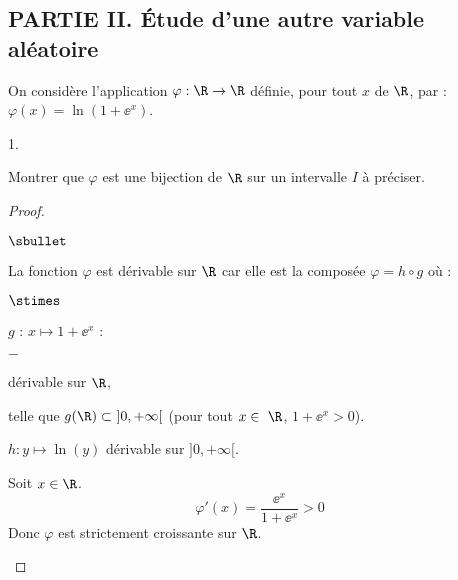 \documentclass[11pt]{article}%
\begin{document}
\subsection*{PARTIE II. Étude d'une autre variable aléatoire}

\noindent
On considère l'application $\varphi: \R\rightarrow\R$ définie, pour
tout $x$ de $\R$, par : $\varphi(x) = \ln(1+\ee^x)$.
\begin{noliste}{1.}
  \setlength{\itemsep}{2mm}%
  \setcounter{enumi}{4}
\item Montrer que $\varphi$ est une bijection de $\R$ sur un 
  intervalle $I$ à préciser.

\begin{proof}~
 \begin{noliste}{$\sbullet$}
 \item La fonction $\varphi$ est dérivable sur $\R$ car elle est la
   composée $\varphi = h\circ g$ où :
  \begin{noliste}{$\stimes$}
  \item $g$ : $x\mapsto 1+\ee^x$ :
      \begin{noliste}{$-$}
      \item dérivable sur $\R$,
      \item telle que $g(\R)\subset \ ]0,+\infty[$ (pour tout $x\in \
        \R$, $1+\ee^x>0$).
      \end{noliste}

    \item $h:y\mapsto \ln(y)$ dérivable sur 
    $]0,+\infty[$.
  \end{noliste}
  
  
  \item Soit $x\in\R$.
  \[
   \varphi'(x) = \dfrac{\ee^x}{1+\ee^x} >0
  \]
  Donc $\varphi$ est strictement croissante sur $\R$.
  
   

\end{noliste}
\end{proof}
\end{noliste}
\end{document}
